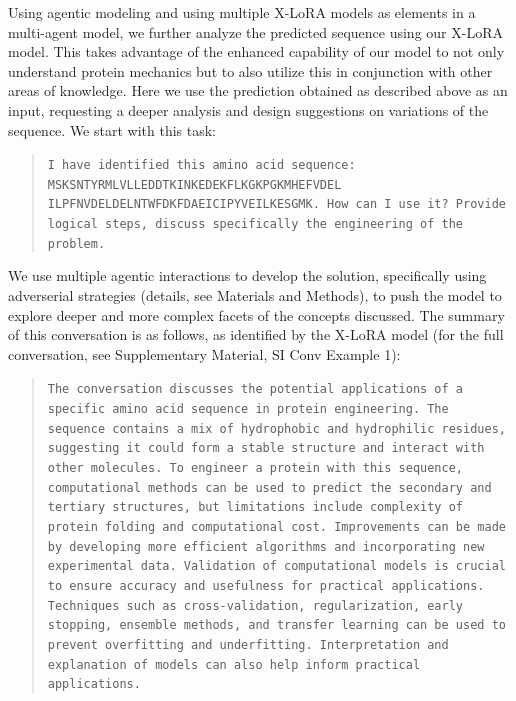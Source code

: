 Using agentic modeling and using multiple X-LoRA models as elements in a multi-agent model, we further analyze the predicted sequence using our X-LoRA model. This takes advantage of the enhanced capability of our model to not only understand protein mechanics but to also utilize this in conjunction with other areas of knowledge.  Here we use the prediction obtained as described above as an input, requesting a deeper analysis and design suggestions on variations of the sequence. We start with this task:
\begin{quote}
\small\texttt{I have identified this amino acid sequence: MSKSNTYRMLVLLEDDTKINKEDEKFLKGKPGKMHEFVDEL
ILPFNVDELDELNTWFDKFDAEICIPYVEILKESGMK. 
\newline\newline
How can I use it? 
\newline\newline
Provide logical steps, discuss specifically the engineering of the problem.
}
\end{quote}

We use multiple agentic interactions to develop the solution, specifically using adverserial strategies (details, see Materials and Methods), to push the model to explore deeper and more complex facets of the concepts discussed. The summary of this conversation is as follows, as identified by the X-LoRA model (for the full conversation, see Supplementary Material, SI Conv Example 1):
\begin{quote}
\small\texttt{The conversation discusses the potential applications of a specific amino acid sequence in protein engineering. The sequence contains a mix of hydrophobic and hydrophilic residues, suggesting it could form a stable structure and interact with other molecules. To engineer a protein with this sequence, computational methods can be used to predict the secondary and tertiary structures, but limitations include complexity of protein folding and computational cost. Improvements can be made by developing more efficient algorithms and incorporating new experimental data. Validation of computational models is crucial to ensure accuracy and usefulness for practical applications. Techniques such as cross-validation, regularization, early stopping, ensemble methods, and transfer learning can be used to prevent overfitting and underfitting. Interpretation and explanation of models can also help inform practical applications.
}
\end{quote}

